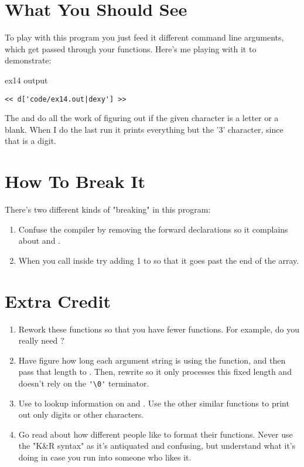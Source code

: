 \section{What You Should See}

To play with this program you just feed it different command line 
arguments, which get passed through your functions.  Here's me
playing with it to demonstrate:

\begin{code}{ex14 output}
\begin{lstlisting}
<< d['code/ex14.out|dexy'] >>
\end{lstlisting}
\end{code}

The  and  do all the work of figuring
out if the given character is a letter or a blank.  When I do the
last run it prints everything but the '3' character, since that 
is a digit.

\section{How To Break It}

There's two different kinds of "breaking" in this program:

\begin{enumerate}
\item Confuse the compiler by removing the forward declarations
    so it complains about  and .
\item When you call  inside  try
    adding 1 to  so that it goes past the end of the
     array.
\end{enumerate}


\section{Extra Credit}

\begin{enumerate}
\item Rework these functions so that you have fewer functions.  For example,
    do you really need ?
\item Have  figure how long each argument string
    is using the  function, and then pass that length
    to .  Then, rewrite  
    so it only processes this fixed length and doesn't rely on the
    \verb|'\0'| terminator.
\item Use  to lookup information on 
    and .  Use the other similar functions to
    print out only digits or other characters.
\item Go read about how different people like to format their
    functions.  Never use the "K\&R syntax" as it's antiquated and
    confusing, but understand what it's doing in case you run
    into someone who likes it.
\end{enumerate}

